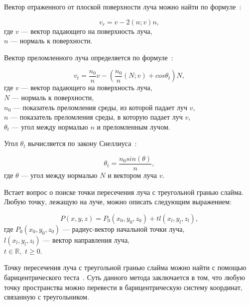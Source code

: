 Вектор отраженного от плоской поверхности луча можно найти по формуле~\cite{raytracingen}:

\begin{equation}\label{refl}
	v_r = v - 2(n; v)n,
\end{equation}
где $v$ --- вектор падающего на поверхность луча,\\
\text{~~~~~~}$n$ --- нормаль к поверхности.

Вектор преломленного луча определяется по формуле~\cite{raytracingen}:

\begin{equation}\label{refr}
	v_t = \frac{n_0}{n} v - (\frac{n_0}{n}(N; v) + cos\theta_t)N,
\end{equation}
где $v$ --- вектор падающего на поверхность луча,\\
\text{~~~~~~}$N$ --- нормаль к поверхности,\\
\text{~~~~~~}$n_0$ --- показатель преломления среды, из которой падает луч $v$,\\
\text{~~~~~~}$n$ --- показатель преломления среды, в которую падает луч $v$,\\
\text{~~~~~~}$\theta_t$ --- угол между нормалью $n$ и преломленным лучом.

Угол $\theta_t$ вычисляется по закону Снеллиуса~\cite{raytracingen}:

\begin{equation}\label{snell}
	\theta_t = \frac{n_0sin(\theta)}{n},
\end{equation}
где $\theta$ --- угол между нормалью $N$ и вектором луча $v$.

Встает вопрос о поиске точки пересечения луча с треугольной гранью слайма. Любую точку, лежащую на луче, можно описать следующим выражением:

\begin{equation}\label{ray}
	P(x, y, z) = P_0(x_0, y_0, z_0) + tl(x_l, y_l, z_l),
\end{equation}
где $P_0(x_0, y_0, z_0)$ --- радиус-вектор начальной точки луча,\\
\text{~~~~~~}$l(x_l, y_l, z_l)$ --- вектор направления луча,\\
\text{~~~~~~}$t \in \mathbb{R},$ $t \ge 0$.

Точку пересечения луча с треугольной гранью слайма можно найти с помощью барицентрического теста~\cite{intersection}. Суть данного метода заключается в том, что любую точку пространства можно перевести в барицентрическую систему координат, связанную с треугольником.

